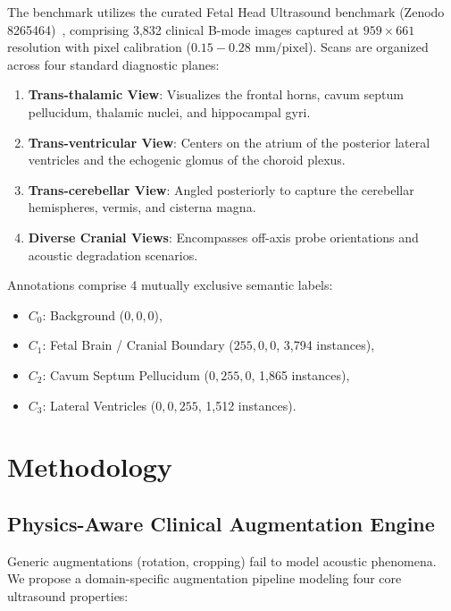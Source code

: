 \documentclass[conference]{IEEEtran}
\begin{document}
The benchmark utilizes the curated Fetal Head Ultrasound benchmark (Zenodo 8265464)~\cite{islam2023fetal}, comprising 3,832 clinical B-mode images captured at $959 \times 661$ resolution with pixel calibration ($0.15 - 0.28\text{ mm/pixel}$). Scans are organized across four standard diagnostic planes:
\begin{enumerate}
    \item \textbf{Trans-thalamic View}: Visualizes the frontal horns, cavum septum pellucidum, thalamic nuclei, and hippocampal gyri.
    \item \textbf{Trans-ventricular View}: Centers on the atrium of the posterior lateral ventricles and the echogenic glomus of the choroid plexus.
    \item \textbf{Trans-cerebellar View}: Angled posteriorly to capture the cerebellar hemispheres, vermis, and cisterna magna.
    \item \textbf{Diverse Cranial Views}: Encompasses off-axis probe orientations and acoustic degradation scenarios.
\end{enumerate}

Annotations comprise 4 mutually exclusive semantic labels:
\begin{itemize}
    \item $C_0$: Background ($0,0,0$),
    \item $C_1$: Fetal Brain / Cranial Boundary ($255,0,0$, 3,794 instances),
    \item $C_2$: Cavum Septum Pellucidum ($0,255,0$, 1,865 instances),
    \item $C_3$: Lateral Ventricles ($0,0,255$, 1,512 instances).
\end{itemize}

\section{Methodology}
\label{sec:methodology}

\subsection{Physics-Aware Clinical Augmentation Engine}
Generic augmentations (rotation, cropping) fail to model acoustic phenomena. We propose a domain-specific augmentation pipeline modeling four core ultrasound properties:
\end{document}
